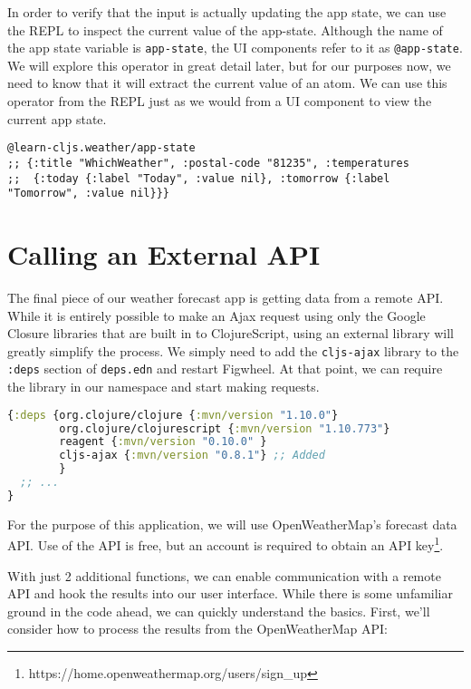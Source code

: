 \documentclass[10pt,twoside,openright]{memoir}
\begin{document}
In order to verify that the input is actually updating the app state, we
can use the REPL to inspect the current value of the app-state. Although
the name of the app state variable is \texttt{app-state}, the UI
components refer to it as \texttt{@app-state}. We will explore this
operator in great detail later, but for our purposes now, we need to
know that it will extract the current value of an atom. We can use this
operator from the REPL just as we would from a UI component to view the
current app state.

\begin{verbatim}
@learn-cljs.weather/app-state
;; {:title "WhichWeather", :postal-code "81235", :temperatures
;;  {:today {:label "Today", :value nil}, :tomorrow {:label "Tomorrow", :value nil}}}
\end{verbatim}

\section{Calling an External API}

The final piece of our weather forecast app is getting data from a
remote API. While it is entirely possible to make an Ajax request using
only the Google Closure libraries that are built in to ClojureScript,
using an external library will greatly simplify the process. We simply
need to add the \texttt{cljs-ajax} library to the \texttt{:deps} section
of \texttt{deps.edn} and restart Figwheel. At that point, we can require
the library in our namespace and start making requests.


\begin{lstlisting}[language=Clojure, caption={deps.edn}]
{:deps {org.clojure/clojure {:mvn/version "1.10.0"}
        org.clojure/clojurescript {:mvn/version "1.10.773"}
        reagent {:mvn/version "0.10.0" }
        cljs-ajax {:mvn/version "0.8.1"} ;; Added
        }
  ;; ...
}
\end{lstlisting}

For the purpose of this application, we will use OpenWeatherMap's
forecast data API. Use of the API is free, but
an account is required to obtain an API key\footnote{https://home.openweathermap.org/users/sign\_up}.

With just 2 additional functions, we can enable communication with a
remote API and hook the results into our user interface. While there is
some unfamiliar ground in the code ahead, we can quickly understand the
basics. First, we'll consider how to process the results from the
OpenWeatherMap API:
\end{document}
